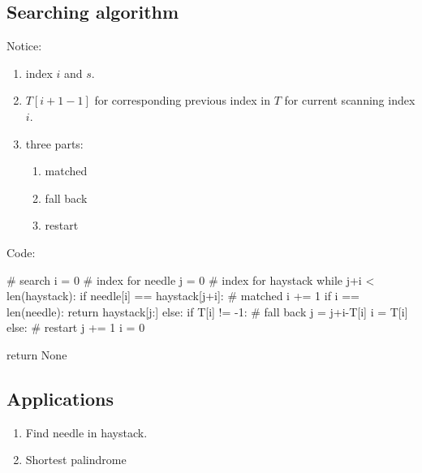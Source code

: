 \subsection{Searching algorithm}
Notice:
\begin{enumerate}
\item index $i$ and $s$.
\item $T[i+1-1]$ for corresponding previous index in $T$ for current scanning index $i$. 
\item three parts:
\begin{enumerate}
\item matched
\item fall back
\item restart 
\end{enumerate}
\end{enumerate}
Code: 
\begin{python}
# search
i = 0  # index for needle 
j = 0  # index for haystack
while j+i < len(haystack):
    if needle[i] == haystack[j+i]:  # matched 
        i += 1
        if i == len(needle):
            return haystack[j:]
    else:
        if T[i] != -1:  # fall back
            j = j+i-T[i]
            i = T[i]
        else:  # restart
            j += 1
            i = 0

return None
\end{python}
\subsection{Applications}
\begin{enumerate}
\item Find needle in haystack. 
\item Shortest palindrome 
\end{enumerate}

